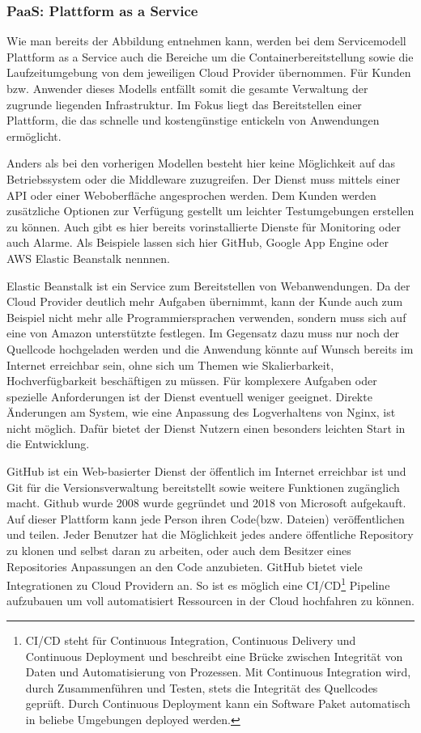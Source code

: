    \subsubsection{PaaS: Plattform as a Service}
   Wie man bereits der Abbildung entnehmen kann, werden bei dem Servicemodell Plattform as a Service auch die Bereiche um die
   Containerbereitstellung sowie die Laufzeitumgebung von dem jeweiligen Cloud Provider übernommen. Für Kunden bzw. Anwender dieses Modells
   entfällt somit die gesamte Verwaltung der zugrunde liegenden Infrastruktur. Im Fokus liegt das Bereitstellen einer Plattform, die das
   schnelle und kostengünstige entickeln von Anwendungen ermöglicht.


   Anders als bei den vorherigen Modellen besteht hier keine Möglichkeit auf das Betriebssystem oder die Middleware zuzugreifen.
   Der Dienst muss mittels einer API oder einer Weboberfläche angesprochen werden. Dem Kunden werden zusätzliche Optionen
   zur Verfügung gestellt um leichter Testumgebungen erstellen zu können. Auch gibt es hier bereits vorinstallierte Dienste für Monitoring oder auch Alarme.
   Als Beispiele lassen sich hier GitHub, Google App Engine oder AWS Elastic Beanstalk nennnen.


   Elastic Beanstalk ist ein Service zum Bereitstellen von Webanwendungen. Da der Cloud Provider deutlich mehr Aufgaben übernimmt, kann der Kunde
   auch zum Beispiel nicht mehr alle Programmiersprachen verwenden, sondern muss sich auf eine von Amazon unterstützte festlegen.
   Im Gegensatz dazu muss nur noch der Quellcode hochgeladen werden und die Anwendung könnte auf Wunsch bereits im Internet erreichbar sein, ohne sich um Themen
   wie Skalierbarkeit, Hochverfügbarkeit beschäftigen zu müssen. Für komplexere Aufgaben oder spezielle Anforderungen ist der Dienst eventuell weniger geeignet.
   Direkte Änderungen am System, wie eine Anpassung des Logverhaltens von Nginx, ist nicht möglich. Dafür bietet der Dienst
   Nutzern einen besonders leichten Start in die Entwicklung.

   GitHub ist ein Web-basierter Dienst der öffentlich im Internet erreichbar ist und Git für die Versionsverwaltung bereitstellt sowie weitere Funktionen zugänglich macht.
   Github wurde 2008 wurde gegründet und 2018 von Microsoft aufgekauft. Auf dieser Plattform kann jede Person ihren Code(bzw. Dateien) veröffentlichen und teilen.
   Jeder Benutzer hat die Möglichkeit jedes andere öffentliche Repository zu klonen und selbst daran zu arbeiten, oder auch dem Besitzer eines Repositories
   Anpassungen an den Code anzubieten. GitHub bietet viele Integrationen zu Cloud Providern an. So ist es möglich eine CI/CD\footnote{CI/CD steht für
   Continuous Integration, Continuous Delivery und Continuous Deployment und beschreibt eine Brücke zwischen Integrität von Daten und Automatisierung von Prozessen.
   Mit Continuous Integration wird, durch Zusammenführen und Testen, stets die Integrität des Quellcodes geprüft. Durch Continuous Deployment kann ein Software Paket
   automatisch in beliebe Umgebungen deployed werden. } Pipeline aufzubauen um voll automatisiert
   Ressourcen in der Cloud hochfahren zu können. \cite[]{GitHub}


